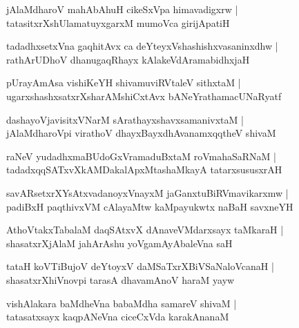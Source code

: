 \documentclass[twoside,12pt,openright]{book}
\newcounter{shloka}[chapter]
\begin{document}
\begin{shloka}%
jAlaMdharoV mahAbAhuH cikeSxVpa himavadigxrw |\\
tatasitxrXshUlamatuyxgarxM mumoVca girijApatiH
\end{shloka}

\begin{shloka}%
tadadhxsetxVna gaqhitAvx ca deYteyxVshashishxvasaninxdhw |\\
rathArUDhoV dhanugaqRhayx kAlakeVdAramabidhxjaH 
\end{shloka}

\begin{shloka}%
pUrayAmAsa vishiKeYH shivamuviRVtaleV sithxtaM |\\
ugarxshashxsatxrXsharAMshiCxtAvx bANeYrathamacUNaRyatf
\end{shloka}

\begin{shloka}%
dashayoVjavisitxVNarM sArathayxshavxsamanivxtaM |\\
jAlaMdharoVpi virathoV dhayxBayxdhAvanamxqqtheV shivaM 
\end{shloka}

\begin{shloka}%
raNeV yudadhxmaBUdoGxVramaduBxtaM roVmahaSaRNaM |\\
tadadxqqSATxvXkAMDakalApxMtashaMkayA tatarxsususxrAH 
\end{shloka}

\begin{shloka}%
savARsetxrXYsAtxvadanoyxVnayxM jaGanxtuBiRVmavikarxmw |\\
padiBxH paqthivxVM cAlayaMtw kaMpayukwtx naBaH savxneYH
\end{shloka}

\begin{shloka}%
AthoVtakxTabalaM daqSAtxvX dAnaveVMdarxsayx taMkaraH |\\
shasatxrXjAlaM jahArAshu yoVgamAyAbaleVna saH 
\end{shloka}

\begin{shloka}%
tataH koVTiBujoV deYtoyxV daMSaTxrXBiVSaNaloVcanaH |\\
shasatxrXhiVnovpi tarasA dhavamAnoV haraM yayw 
\end{shloka}

\begin{shloka}%
vishAlakara baMdheVna babaMdha samareV shivaM |\\
tatasatxsayx kaqpANeVna ciceCxVda karakAnanaM 
\end{shloka}
\end{document}
